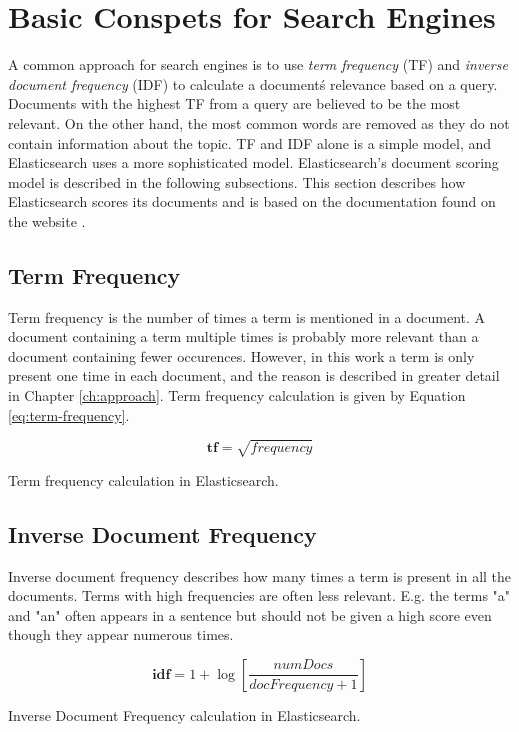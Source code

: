 \section{Basic Conspets for Search Engines}
A common approach for search engines is to use \textit{term frequency} (TF) and \textit{inverse document frequency} (IDF) to calculate a document\'s relevance based on a query.
Documents with the highest TF from a query are believed to be the most relevant.
On the other hand, the most common words are removed as they do not contain information about the topic.
TF and IDF alone is a simple model, and Elasticsearch uses a more sophisticated model.
Elasticsearch's document scoring model is described in the following subsections.
This section describes how Elasticsearch scores its documents and is based on the documentation found on the website \cite{elasticsearch-scoring}.

\subsection{Term Frequency}
Term frequency is the number of times a term is mentioned in a document.
A document containing a term multiple times is probably more relevant than a document containing fewer occurences.
However, in this work a term is only present one time in each document, and the reason is described in greater detail in Chapter \ref{ch:approach}.
Term frequency calculation is given by Equation \ref{eq:term-frequency}.

\begin{cequation}[H]
	\begin{equation}
		\mathbf{tf} = \sqrt{frequency}
	\end{equation}
	\caption{Term frequency calculation in Elasticsearch.}
  \label{eq:term-frequency}
\end{cequation}

\subsection{Inverse Document Frequency}
Inverse document frequency describes how many times a term is present in all the documents.
Terms with high frequencies are often less relevant.
E.g. the terms "a" and "an" often appears in a sentence but should not be given a high score even though they appear numerous times.
\begin{cequation}[H]
	\begin{equation}
		\mathbf{idf} = 1 + \log{[\frac{numDocs}{docFrequency + 1}]}
	\end{equation}
	\caption{Inverse Document Frequency calculation in Elasticsearch.}
  \label{eq:idf}
\end{cequation}


